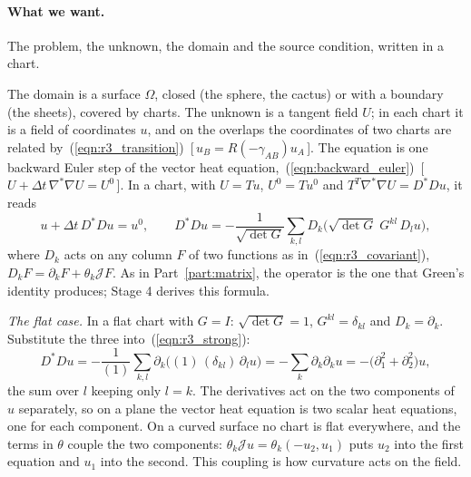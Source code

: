 \paragraph{What we want.} The problem, the unknown, the domain and the source condition, written in a chart.

The domain is a surface $\Omega$, closed (the sphere, the cactus) or with a boundary (the sheets), covered by charts. The unknown is a tangent field $U$; in each chart it is a field of coordinates $u$, and on the overlaps the coordinates of two charts are related by~(\ref{eqn:r3_transition})~[\,$u_B = R(-\gamma_{AB})u_A$\,]. The equation is one backward Euler step of the vector heat equation,~(\ref{eqn:backward_euler})~[\,$U + \Delta t\,\nabla^*\nabla U = U^0$\,]. In a chart, with $U = Tu$, $U^0 = Tu^0$ and $T^T\nabla^*\nabla U = D^*Du$, it reads
\begin{equation}
\label{eqn:r3_strong}
u + \Delta t\, D^*Du = u^0, \qquad D^*Du = -\frac{1}{\sqrt{\det G}} \sum_{k,l} D_k\Big(\sqrt{\det G}\; G^{kl}\, D_lu\Big) ,
\end{equation}
where $D_k$ acts on any column $F$ of two functions as in~(\ref{eqn:r3_covariant}), $D_k F = \partial_k F + \theta_k\mathcal J F$. As in Part~\ref{part:matrix}, the operator is the one that Green's identity produces; Stage 4 derives this formula.

\emph{The flat case.} In a flat chart with $G = I$: $\sqrt{\det G} = 1$, $G^{kl} = \delta_{kl}$ and $D_k = \partial_k$. Substitute the three into~(\ref{eqn:r3_strong}):
\begin{equation*}
D^*Du = -\frac{1}{(1)} \sum_{k,l} \partial_k\Big((1)\,(\delta_{kl})\,\partial_lu\Big) = -\sum_k \partial_k\partial_ku = -\big(\partial_1^2 + \partial_2^2\big)u ,
\end{equation*}
the sum over $l$ keeping only $l = k$. The derivatives act on the two components of $u$ separately, so on a plane the vector heat equation is two scalar heat equations, one for each component. On a curved surface no chart is flat everywhere, and the terms in $\theta$ couple the two components: $\theta_k\mathcal J u = \theta_k(-u_2, u_1)$ puts $u_2$ into the first equation and $u_1$ into the second. This coupling is how curvature acts on the field.

